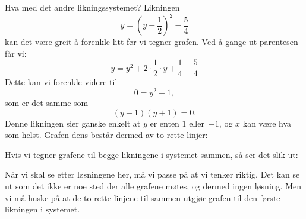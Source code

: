 \begin{losning}
Hva med det andre likningssystemet?  Likningen
\[
y = \left( y + \frac{1}{2} \right)^2 - \frac{5}{4}
\]
kan det være greit å forenkle litt før vi tegner grafen.  Ved å gange
ut parentesen får vi:
\[
y = y^2 + 2 \cdot \frac{1}{2} \cdot y + \frac{1}{4} - \frac{5}{4}
\]
Dette kan vi forenkle videre til
\[
0 = y^2 - 1,
\]
som er det samme som
\[
(y - 1)(y + 1) = 0.
\]
Denne likningen sier ganske enkelt at $y$ er enten $1$ eller~$-1$, og
$x$ kan være hva som helst.  Grafen dens består dermed av to rette
linjer:
\begin{center}
\end{center}
Hvis vi tegner grafene til begge likningene i systemet sammen, så ser
det slik ut:
\begin{center}
\end{center}
Når vi skal se etter løsningene her, må vi passe på at vi tenker
riktig.  Det kan se ut som det ikke er noe sted der alle grafene
møtes, og dermed ingen løsning.  Men vi må huske på at de to rette
linjene til sammen utgjør grafen til den første likningen i systemet.


\end{losning}
